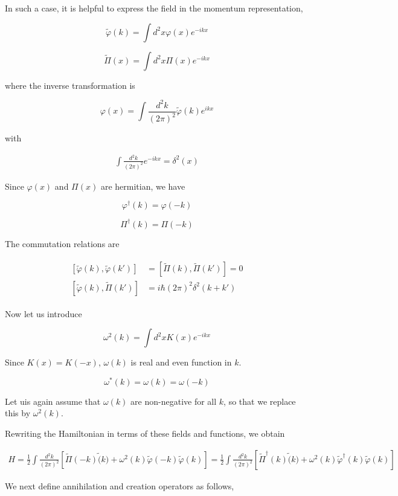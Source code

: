 In such a case, it is helpful to express the field in the momentum representation, 

\[\tilde{\varphi}(k) = \int d^2 x\varphi(x)e^{-ikx} \]

\[\tilde{\Pi}(x) = \int d^2 x \Pi(x) e^{-ikx} \]

where the inverse transformation is 

\[\varphi(x) = \int\frac{d^2 k}{(2\pi)^2} \tilde{\varphi}(k)e^{ikx} \]

with

\begin{align}
\int \frac{d^2 k}{(2\pi)^2}e^{-ikx} = \delta^2(x)
\end{align}

Since $\varphi(x)$ and $\Pi(x)$ are hermitian, we have

\[\varphi^\dagger(k) = \varphi(-k) \]

\[\Pi^\dagger(k) = \Pi(-k) \]

The commutation relations are

\begin{align}\label{1.4.6}
\begin{split}
[\tilde{\varphi}(k), \tilde{\varphi}(k')] &= [\tilde{\Pi}(k), \tilde{\Pi}(k')] = 0\\
[\tilde{\varphi}(k),\tilde{\Pi}(k')] &= i\hbar(2\pi)^2\delta^2(k+k')
\end{split}
\end{align}

Now let us introduce 

\[\omega^2(k) = \int d^2x K(x)e^{-ikx} \]

Since $K(x) = K(-x)$, $\omega(k)$ is real and even function in $k$. 

\[\omega^*(k) = \omega(k) = \omega(-k) \]

Let uis again assume that $\omega(k)$ are non-negative for all $k$, so that we replace this by $\omega^2(k)$. 

Rewriting the Hamiltonian in terms of these fields and functions, we obtain

\begin{align}
H = \frac{1}{2}\int\frac{d^2 k}{(2\pi)^2}\left[\tilde{\Pi}(-k)\tilde(k)+\omega^2(k)\tilde{\varphi}(-k)\tilde{\varphi}(k)\right] = \frac{1}{2}\int\frac{d^2 k}{(2\pi)^2}\left[\tilde{\Pi}^\dagger (k)\tilde(k)+\omega^2(k)\tilde{\varphi}^\dagger(k)\tilde{\varphi}(k)\right]
\end{align}

We next define annihilation and creation operators as follows, 

